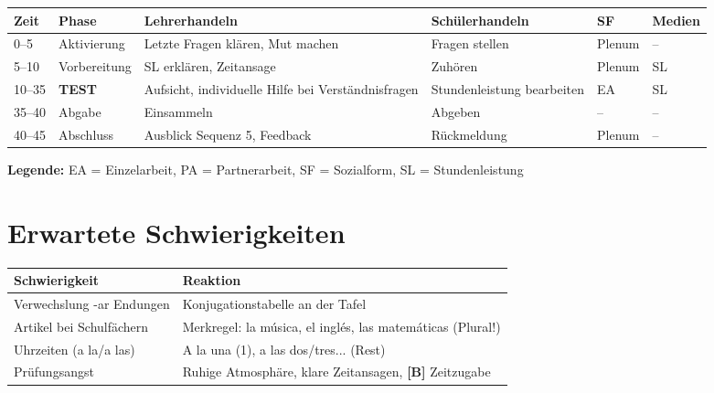 \documentclass[11pt,a4paper]{article}
\newcommand{\B}{\textcolor{basis}{\textbf{[B]}}}
\begin{document}
\begin{longtable}{|p{1cm}|p{1.5cm}|p{4cm}|p{3cm}|p{2cm}|p{2cm}|}
\hline
\textbf{Zeit} & \textbf{Phase} & \textbf{Lehrerhandeln} & \textbf{Schülerhandeln} & \textbf{SF} & \textbf{Medien} \\
\hline
\endhead

0--5 & Aktivierung & Letzte Fragen klären, Mut machen & Fragen stellen & Plenum & -- \\
\hline

5--10 & Vorbereitung & SL erklären, Zeitansage & Zuhören & Plenum & SL \\
\hline

10--35 & \textbf{TEST} & Aufsicht, individuelle Hilfe bei Verständnisfragen & Stundenleistung bearbeiten & EA & SL \\
\hline

35--40 & Abgabe & Einsammeln & Abgeben & -- & -- \\
\hline

40--45 & Abschluss & Ausblick Sequenz 5, Feedback & Rückmeldung & Plenum & -- \\
\hline
\end{longtable}

\textbf{Legende:} EA = Einzelarbeit, PA = Partnerarbeit, SF = Sozialform, SL = Stundenleistung

\section{Erwartete Schwierigkeiten}

\begin{tabular}{|p{5cm}|p{8cm}|}
\hline
\textbf{Schwierigkeit} & \textbf{Reaktion} \\
\hline
Verwechslung -ar Endungen & Konjugationstabelle an der Tafel \\
\hline
Artikel bei Schulfächern & Merkregel: la música, el inglés, las matemáticas (Plural!) \\
\hline
Uhrzeiten (a la/a las) & A la una (1), a las dos/tres... (Rest) \\
\hline
Prüfungsangst & Ruhige Atmosphäre, klare Zeitansagen, \B{} Zeitzugabe \\
\hline
\end{tabular}

\end{document}
